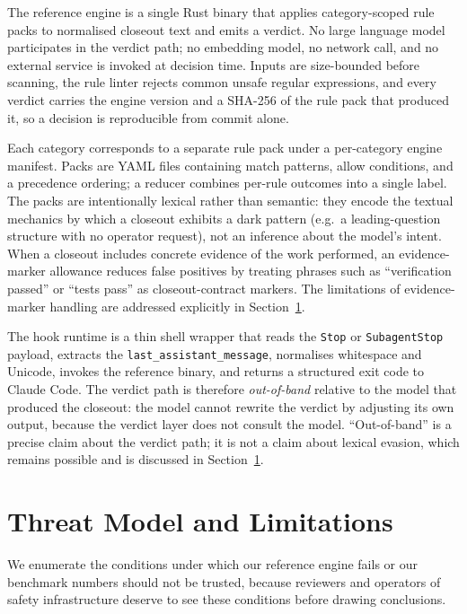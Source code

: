 \documentclass{safeai2026}
\begin{document}
The reference engine is a single Rust binary that applies category-scoped rule packs to normalised closeout text and emits a verdict.
No large language model participates in the verdict path; no embedding model, no network call, and no external service is invoked at decision time.
Inputs are size-bounded before scanning, the rule linter rejects common unsafe regular expressions, and every verdict carries the engine version and a SHA-256 of the rule pack that produced it, so a decision is reproducible from commit alone.

Each category corresponds to a separate rule pack under a per-category engine manifest.
Packs are YAML files containing match patterns, allow conditions, and a precedence ordering; a reducer combines per-rule outcomes into a single label.
The packs are intentionally lexical rather than semantic: they encode the textual mechanics by which a closeout exhibits a dark pattern (e.g.\ a leading-question structure with no operator request), not an inference about the model's intent.
When a closeout includes concrete evidence of the work performed, an evidence-marker allowance reduces false positives by treating phrases such as ``verification passed'' or ``tests pass'' as closeout-contract markers.
The limitations of evidence-marker handling are addressed explicitly in Section~\ref{sec:threat}.

The hook runtime is a thin shell wrapper that reads the \texttt{Stop} or \texttt{SubagentStop} payload, extracts the \texttt{last\_assistant\_message}, normalises whitespace and Unicode, invokes the reference binary, and returns a structured exit code to Claude Code.
The verdict path is therefore \emph{out-of-band} relative to the model that produced the closeout: the model cannot rewrite the verdict by adjusting its own output, because the verdict layer does not consult the model.
``Out-of-band'' is a precise claim about the verdict path; it is not a claim about lexical evasion, which remains possible and is discussed in Section~\ref{sec:threat}.

\section{Threat Model and Limitations}\label{sec:threat}

We enumerate the conditions under which our reference engine fails or our benchmark numbers should not be trusted, because reviewers and operators of safety infrastructure deserve to see these conditions before drawing conclusions.
\end{document}
